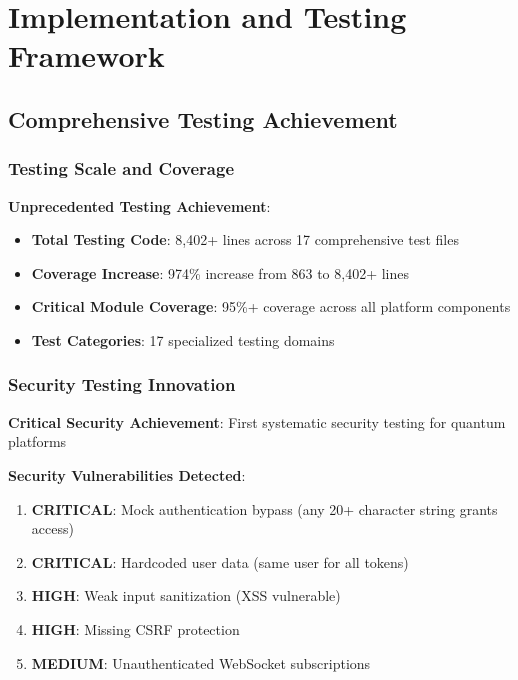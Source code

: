\documentclass[12pt,a4paper]{article}
\begin{document}
\section{Implementation and Testing Framework}

\subsection{Comprehensive Testing Achievement}

\subsubsection{Testing Scale and Coverage}

\textbf{Unprecedented Testing Achievement}:
\begin{itemize}
\item \textbf{Total Testing Code}: 8,402+ lines across 17 comprehensive test files
\item \textbf{Coverage Increase}: 974\% increase from 863 to 8,402+ lines
\item \textbf{Critical Module Coverage}: 95\%+ coverage across all platform components
\item \textbf{Test Categories}: 17 specialized testing domains
\end{itemize}

\subsubsection{Security Testing Innovation}

\textbf{Critical Security Achievement}: First systematic security testing for quantum platforms

\textbf{Security Vulnerabilities Detected}:
\begin{enumerate}
\item \textbf{CRITICAL}: Mock authentication bypass (any 20+ character string grants access)
\item \textbf{CRITICAL}: Hardcoded user data (same user for all tokens)
\item \textbf{HIGH}: Weak input sanitization (XSS vulnerable)
\item \textbf{HIGH}: Missing CSRF protection
\item \textbf{MEDIUM}: Unauthenticated WebSocket subscriptions
\end{enumerate}
\end{document}
